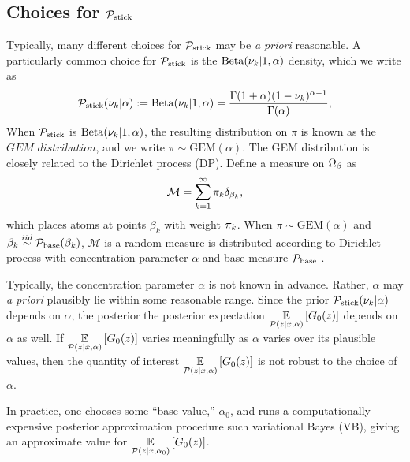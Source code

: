 


\subsection{Choices for $\mathcal{P}_{\mathrm{stick}}$}

Typically, many different choices for $\mathcal{P}_{\mathrm{stick}}$ may be {\em a priori}
reasonable.  A particularly common choice for $\mathcal{P}_{\mathrm{stick}}$ is the
$\mathrm{Beta}(\nu_{k} \vert 1, \alpha)$ density, which we write as
%
\begin{align*}
%
\pstick(\nuk \vert \alpha) :=
\mathrm{Beta}(\nuk \vert 1, \alpha) =
    \frac{\Gamma(1 + \alpha) (1 - \nuk)^{\alpha - 1}}
         {\Gamma(\alpha)},
%
\end{align*}
%
When $\mathcal{P}_{\mathrm{stick}}$ is $\mathrm{Beta}(\nu_{k} \vert 1, \alpha)$, the resulting
distribution on $\pi$ is known as the $\textit{GEM distribution}$, and we write
$\pi \sim \mathrm{GEM}(\alpha)$.
%
The GEM distribution is closely related to the Dirichlet process (DP).
Define a measure on $\Omega_{\beta}$ as
%
\begin{align*}
  \mathcal{M} = \sum_{k = 1}^\infty \pi_k\delta_{\beta_k},
\end{align*}
%
which places atoms at points $\beta_k$ with weight $\pi_k$. When $\pi \sim
\mathrm{GEM}(\alpha)$ and $\beta_k \overset{iid}{\sim} \mathcal{P}_{\mathrm{base}}(\beta_k)$, $\mathcal{M}$
is a random measure is distributed according to Dirichlet process with
concentration parameter $\alpha$ and base measure $\mathcal{P}_{\mathrm{base}}$
\citep{ferguson:1973:bayesian, sethuraman:1994:constructivedp}.

Typically, the concentration parameter $\alpha$ is not known in advance.
Rather, $\alpha$ may {\em a priori} plausibly lie within some reasonable range.
Since the prior $\mathcal{P}_{\mathrm{stick}}(\nu_{k} \vert \alpha)$ depends on $\alpha$, the posterior
the posterior expectation $\underset{\mathcal{P}(z \vert x, \alpha)}{\mathbb{E}}\left[G_0(z)\right]$
depends on $\alpha$ as well.  If $\underset{\mathcal{P}(z \vert x,
\alpha)}{\mathbb{E}}\left[G_0(z)\right]$ varies meaningfully as $\alpha$ varies over its
plausible values, then the quantity of interest $\underset{\mathcal{P}(z \vert x,
\alpha)}{\mathbb{E}}\left[G_0(z)\right]$ is not robust to the choice of $\alpha$.

In practice, one chooses some ``base value,'' $\alpha_0$, and runs a
computationally expensive posterior approximation procedure such variational
Bayes (VB), giving an approximate value for $\underset{\mathcal{P}(z \vert x,
\alpha_0)}{\mathbb{E}}\left[G_0(z)\right]$.


